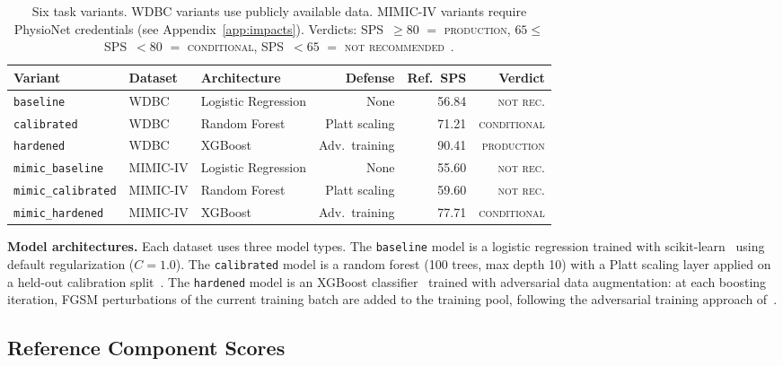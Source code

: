 \documentclass[11pt]{article}
\begin{document}
\begin{table}[t]
\caption{Six task variants. WDBC variants use publicly available data.
MIMIC-IV variants require PhysioNet credentials (see
Appendix~\ref{app:impacts}). Verdicts: SPS~$\geq 80$ $=$ \textsc{production},
$65 \leq$ SPS~$< 80$ $=$ \textsc{conditional}, SPS~$< 65$ $=$
\textsc{not recommended}~\citep{eniolade2026security}.}
\label{tab:variants}
\vskip 0.1in
\centering
\small
\begin{tabular}{@{}lllrrr@{}}
\toprule
\textbf{Variant} & \textbf{Dataset} & \textbf{Architecture} &
\textbf{Defense} & \textbf{Ref.\ SPS} & \textbf{Verdict} \\
\midrule
\texttt{baseline}          & WDBC     & Logistic Regression  &
  None                 & 56.84 & \textsc{not rec.} \\
\texttt{calibrated}        & WDBC     & Random Forest        &
  Platt scaling        & 71.21 & \textsc{conditional} \\
\texttt{hardened}          & WDBC     & XGBoost              &
  Adv.\ training      & 90.41 & \textsc{production} \\
\texttt{mimic\_baseline}   & MIMIC-IV & Logistic Regression  &
  None                 & 55.60 & \textsc{not rec.} \\
\texttt{mimic\_calibrated} & MIMIC-IV & Random Forest        &
  Platt scaling        & 59.60 & \textsc{not rec.} \\
\texttt{mimic\_hardened}   & MIMIC-IV & XGBoost              &
  Adv.\ training      & 77.71 & \textsc{conditional} \\
\bottomrule
\end{tabular}
\end{table}

\textbf{Model architectures.}
Each dataset uses three model types. The \texttt{baseline} model is a
logistic regression trained with scikit-learn~\citep{pedregosa2011scikit}
using default regularization ($C = 1.0$). The \texttt{calibrated} model is a
random forest (100 trees, max depth 10) with a Platt scaling layer applied
on a held-out calibration split~\citep{platt1999probabilistic,
niculescu2005predicting}. The \texttt{hardened} model is an XGBoost
classifier~\citep{chen2016xgboost} trained with adversarial data augmentation:
at each boosting iteration, FGSM perturbations of the current training batch
are added to the training pool, following the adversarial training approach
of~\citet{madry2018towards}.

\subsection{Reference Component Scores}
\label{sec:refscores}
\end{document}
